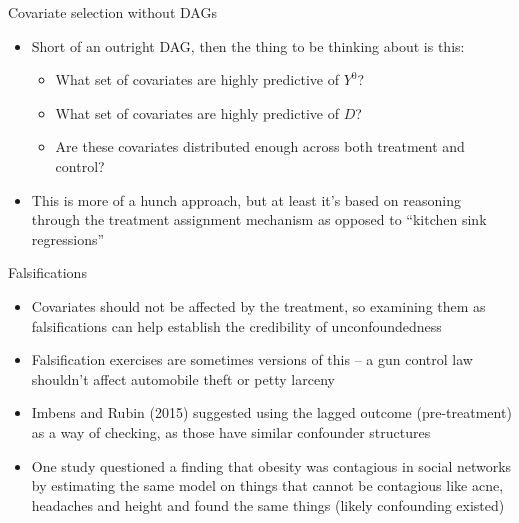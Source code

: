 \documentclass{beamer}
\begin{document}
\begin{frame}{Covariate selection without DAGs}

\begin{itemize}
\item Short of an outright DAG, then the thing to be thinking about is this:
	\begin{itemize}
	\item What set of covariates are highly predictive of $Y^0$?
	\item What set of covariates are highly predictive of $D$?
	\item Are these covariates distributed enough across both treatment and control?
	\end{itemize}
\item This is more of a hunch approach, but at least it's based on reasoning through the treatment assignment mechanism as opposed to ``kitchen sink regressions''
\end{itemize}

\end{frame}

\begin{frame}{Falsifications}

\begin{itemize}
\item Covariates should not be affected by the treatment, so examining them as falsifications can help establish the credibility of unconfoundedness
\item Falsification exercises are sometimes versions of this -- a gun control law shouldn't affect automobile theft or petty larceny
\item Imbens and Rubin (2015) suggested using the lagged outcome (pre-treatment) as a way of checking, as those have similar confounder structures
\item One study questioned a finding that obesity was contagious in social networks by estimating the same model on things that cannot be contagious like acne, headaches and height and found the same things (likely confounding existed)
\end{itemize}

\end{frame}
\end{document}
